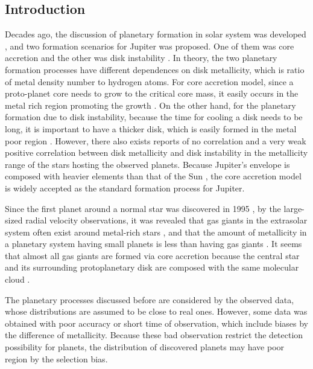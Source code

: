 \documentclass[twocolumn, dvipdfmx]{aastex62}
\begin{document}
\begin{CJK*}{UTF8}{min}
\section{Introduction} \label{sec:introduction}

Decades ago, the discussion of planetary formation in solar system was developed \citep{1985Arizona}, and two formation scenarios for Jupiter was proposed. One of them was core accretion \citep{1974Icar...22..416P, 1980PThPh..64..544M, 1996Icar..124...62P} and the other was disk instability \citep{1951PNAS...37....1K, 1997Sci...276.1836B, 2002Sci...298.1756M}. In theory, the two planetary formation processes have different dependences on disk metallicity, which is ratio of metal density number to hydrogen atoms. For core accretion model, since a proto-planet core needs to grow to the critical core mass, it easily occurs in the metal rich region promoting the growth \citep{2004ApJ...616..567I, 2012A&A...541A..97M}. On the other hand, for the planetary formation due to disk instability, because the time for cooling a disk needs to be long, it is important to have a thicker disk, which is easily formed in the metal poor region \citep{2006ApJ...636L.149C, 2007Arizona}. However, there also exists reports of no correlation \citep{2002ApJ...567L.149B} and a very weak positive correlation \citep{2007ApJ...661L..77M} between disk metallicity and disk instability in the metallicity range of the stars hosting the observed planets. Because Jupiter's envelope is composed with heavier elements than that of the Sun \citep{2003NewAR..47....1Y}, the core accretion model is widely accepted as the standard formation process for Jupiter.

Since the first planet around a normal star was discovered in 1995
\citep{1995Natur.378..355M}, by the large-sized radial velocity observations, it was revealed that gas giants in the extrasolar system often exist around metal-rich stars \citep{2003A&A...398..363S, 2005ApJ...622.1102F}, and that the amount of metallicity in a planetary system having small planets is less than having gas giants \citep{2011arXiv1109.2497M, 2015AJ....149...14W}. It seems that almost all gas giants are formed via core accretion because the central star and its surrounding protoplanetary disk are composed with the same molecular cloud \citep{2004ApJ...616..567I, 2012A&A...541A..97M}.

The planetary processes discussed before are considered by the observed data, whose distributions are assumed to be close to real ones. However, some data was obtained with poor accuracy or short time of observation, which include biases by the difference of metallicity. Because these bad observation restrict the detection possibility for planets, the distribution of discovered planets may have poor region by the selection bias.


\end{CJK*}
\end{document}
